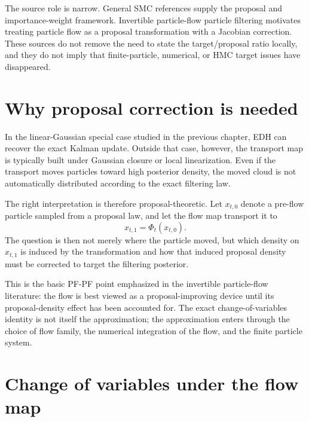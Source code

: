 The source role is narrow.  General SMC references
\citep{doucet2001sequential,chopin2020introduction} supply the proposal and
importance-weight framework.  Invertible particle-flow particle filtering
\citep{li2017particle} motivates treating particle flow as a proposal
transformation with a Jacobian correction.  These sources do not remove the
need to state the target/proposal ratio locally, and they do not imply that
finite-particle, numerical, or HMC target issues have disappeared.

\section{Why proposal correction is needed}
\label{sec:bf-pfpf-why-correction}

In the linear-Gaussian special case studied in the previous chapter, EDH can
recover the exact Kalman update.  Outside that case, however, the transport map
is typically built under Gaussian closure or local linearization.  Even if the
transport moves particles toward high posterior density, the moved cloud is not
automatically distributed according to the exact filtering law.

The right interpretation is therefore proposal-theoretic.  Let
$x_{t,0}$ denote a pre-flow particle sampled from a proposal law, and let the
flow map transport it to
\begin{equation}
\label{eq:bf-pfpf-flow-map}
  x_{t,1} = \Phi_t(x_{t,0}).
\end{equation}
The question is then not merely where the particle moved, but which density on
$x_{t,1}$ is induced by the transformation and how that induced proposal density
must be corrected to target the filtering posterior.

This is the basic PF-PF point emphasized in the invertible particle-flow
literature: the flow is best viewed as a proposal-improving device until its
proposal-density effect has been accounted for.  The exact change-of-variables
identity is not itself the approximation; the approximation enters through the
choice of flow family, the numerical integration of the flow, and the finite
particle system.

\section{Change of variables under the flow map}
\label{sec:bf-pfpf-change-of-variables}

